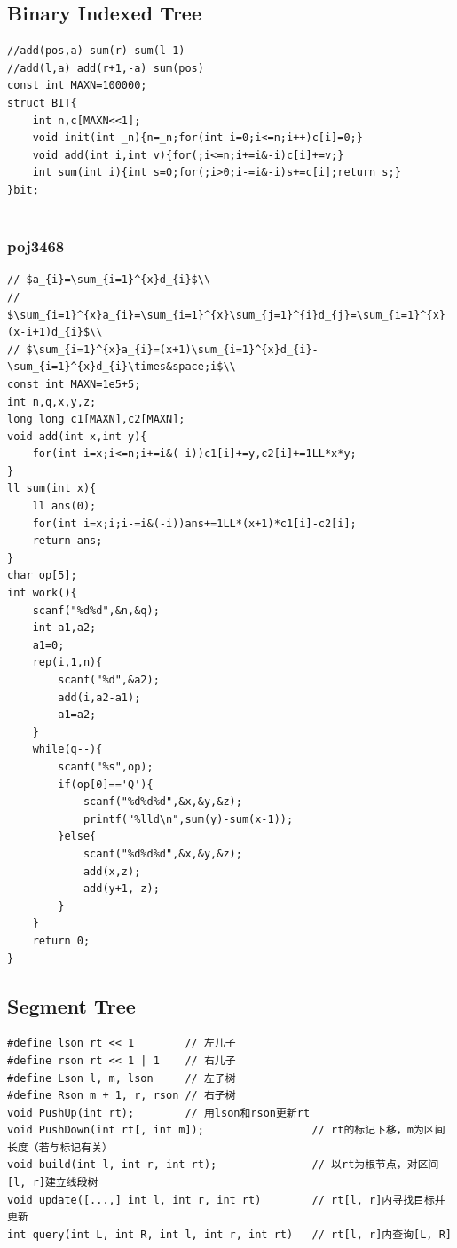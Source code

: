 \documentclass[twoside]{article}
\begin{document}
\subsection{Binary Indexed Tree}
\begin{lstlisting}
//add(pos,a) sum(r)-sum(l-1)
//add(l,a) add(r+1,-a) sum(pos)
const int MAXN=100000;
struct BIT{
    int n,c[MAXN<<1];
    void init(int _n){n=_n;for(int i=0;i<=n;i++)c[i]=0;}
    void add(int i,int v){for(;i<=n;i+=i&-i)c[i]+=v;}
    int sum(int i){int s=0;for(;i>0;i-=i&-i)s+=c[i];return s;}
}bit;


\end{lstlisting}
\subsubsection{poj3468}
\begin{lstlisting}
// $a_{i}=\sum_{i=1}^{x}d_{i}$\\
// $\sum_{i=1}^{x}a_{i}=\sum_{i=1}^{x}\sum_{j=1}^{i}d_{j}=\sum_{i=1}^{x}(x-i+1)d_{i}$\\
// $\sum_{i=1}^{x}a_{i}=(x+1)\sum_{i=1}^{x}d_{i}-\sum_{i=1}^{x}d_{i}\times&space;i$\\
const int MAXN=1e5+5;
int n,q,x,y,z;
long long c1[MAXN],c2[MAXN];
void add(int x,int y){
    for(int i=x;i<=n;i+=i&(-i))c1[i]+=y,c2[i]+=1LL*x*y;
}
ll sum(int x){
    ll ans(0);
    for(int i=x;i;i-=i&(-i))ans+=1LL*(x+1)*c1[i]-c2[i];
    return ans;
}
char op[5];
int work(){
    scanf("%d%d",&n,&q);
    int a1,a2;
    a1=0;
    rep(i,1,n){
        scanf("%d",&a2);
        add(i,a2-a1);
        a1=a2;
    }
    while(q--){
        scanf("%s",op);
        if(op[0]=='Q'){
            scanf("%d%d%d",&x,&y,&z);
            printf("%lld\n",sum(y)-sum(x-1));
        }else{
            scanf("%d%d%d",&x,&y,&z);
            add(x,z);
            add(y+1,-z);
        }
    }
    return 0;
}
\end{lstlisting}
\subsection{Segment Tree}
\begin{lstlisting}
#define lson rt << 1        // 左儿子
#define rson rt << 1 | 1    // 右儿子
#define Lson l, m, lson     // 左子树
#define Rson m + 1, r, rson // 右子树
void PushUp(int rt);        // 用lson和rson更新rt
void PushDown(int rt[, int m]);                 // rt的标记下移，m为区间长度（若与标记有关）
void build(int l, int r, int rt);               // 以rt为根节点，对区间[l, r]建立线段树
void update([...,] int l, int r, int rt)        // rt[l, r]内寻找目标并更新
int query(int L, int R, int l, int r, int rt)   // rt[l, r]内查询[L, R]
\end{lstlisting}
\end{document}
